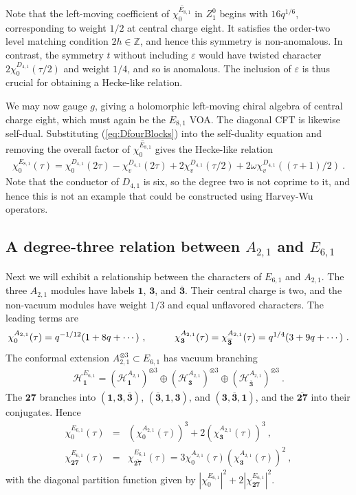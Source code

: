 \documentclass[12pt]{article}
\numberwithin{equation}{section}
\newcommand{\bea}{\begin{eqnarray}}
\newcommand{\eea}{\end{eqnarray}}
\def\no{\nonumber}
\def\ZZ{\mathbb{Z}}
\theoremstyle{remark}
\begin{document}
Note that the left-moving coefficient of $\overline{\chi^{E_{8,1}}_0}$ in $Z^0_1$ begins with $16q^{1/6}$, corresponding to weight $1/2$ at central charge eight. It satisfies the order-two level matching condition $2h\in\ZZ$, and hence this symmetry is non-anomalous. In contrast, the symmetry $t$ without including $\varepsilon$ would have twisted character $2\chi^{D_{4,1}}_0(\tau/2)$ and weight $1/4$, and so is anomalous. The inclusion of $\varepsilon$ is thus crucial for obtaining a Hecke-like relation. 

We may now gauge $g$, giving a holomorphic left-moving chiral algebra of central charge eight, which must again be the $E_{8,1}$ VOA. The diagonal CFT is likewise self-dual. Substituting (\ref{eq:DfourBlocks}) into the self-duality equation and removing the overall factor of $\overline{\chi^{E_{8,1}}_0}$ gives the Hecke-like relation
\bea
\chi^{E_{8,1}}_0(\tau)=\chi^{D_{4,1}}_0(2\tau)-\chi^{D_{4,1}}_v(2\tau)+2\chi^{D_{4,1}}_v(\tau/2)+2\omega\chi^{D_{4,1}}_v\left((\tau+1)/2\right)~.
\eea
Note that the conductor of $D_{4,1}$ is six, so the degree two is not coprime to it, and hence this is not an example that could be constructed using Harvey-Wu operators.

\subsection{A degree-three relation between $A_{2,1}$ and $E_{6,1}$}
\label{sec:AtwoEsix}

Next we will exhibit a relationship between the characters of  $E_{6,1}$ and  $A_{2,1}$. The  three $A_{2,1}$ modules have labels $\mathbf1$, $\mathbf3$, and $\overline{\mathbf3}$. Their central charge is two, and the non-vacuum modules have weight $1/3$ and equal unflavored characters. The leading terms are
\bea
\chi^{A_{2,1}}_0(\tau)=q^{-1/12}(1+8 q + \cdots)~,
\hspace{0.4 in}
\chi^{A_{2,1}}_{\mathbf3}(\tau)=\chi^{A_{2,1}}_{\overline{\mathbf3}}(\tau)=q^{1/4}(3+9 q + \cdots)~.
\eea
The conformal extension $A_{2,1}^{\otimes3}\subset E_{6,1}$ has vacuum branching
\bea \label{eq:AtwoModules}
\mathcal H^{E_{6,1}}_{\mathbf1}=\left(\mathcal H^{A_{2,1}}_{\mathbf1}\right)^{\otimes3}\oplus\left(\mathcal H^{A_{2,1}}_{\mathbf3}\right)^{\otimes3}\oplus\left(\mathcal H^{A_{2,1}}_{\overline{\mathbf3}}\right)^{\otimes3}~.
\eea
The $\mathbf{27}$ branches into $(\mathbf1,\mathbf3,\overline{\mathbf3})$, $(\overline{\mathbf3},\mathbf1,\mathbf3)$, and $(\mathbf3,\overline{\mathbf3},\mathbf1)$, and the $\overline{\mathbf{27}}$ into their conjugates. Hence
\bea
\chi^{E_{6,1}}_0(\tau)&=&\left(\chi^{A_{2,1}}_0(\tau)\right)^3+2\left(\chi^{A_{2,1}}_{\mathbf3}(\tau)\right)^3~,\no\\
\chi^{E_{6,1}}_{\mathbf{27}}(\tau)&=&\chi^{E_{6,1}}_{\overline{\mathbf{27}}}(\tau)=3\chi^{A_{2,1}}_0(\tau)\left(\chi^{A_{2,1}}_{\mathbf3}(\tau)\right)^2~,
\eea
with the diagonal partition function given by $|\chi^{E_{6,1}}_0|^2+2|\chi^{E_{6,1}}_{\mathbf{27}}|^2$.
\end{document}
